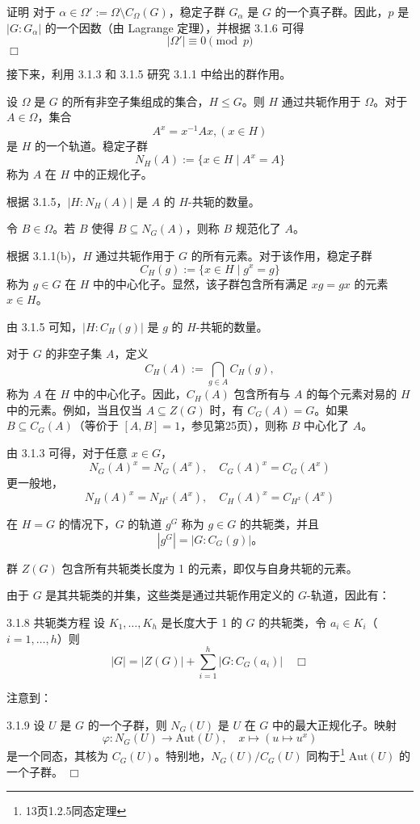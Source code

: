 \documentclass[UTF8]{ctexart}
\begin{document}
证明
对于 $\alpha \in \Omega' := \Omega \setminus C_\Omega(G)$，稳定子群 $G_\alpha$ 是 $G$ 的一个真子群。因此，$p$ 是 $|G : G_\alpha|$ 的一个因数（由 Lagrange 定理），并根据 3.1.6 可得
$$
    |\Omega'| \equiv 0 \pmod{p}
$$
$\Box$


接下来，利用 3.1.3 和 3.1.5 研究 3.1.1 中给出的群作用。

设 $\Omega$ 是 $G$ 的所有非空子集组成的集合，$H \leq G$。则 $H$ 通过共轭作用于 $\Omega$。对于 $A \in \Omega$，集合
$$
    A^x = x^{-1}Ax  ,(x \in H)
$$
是 $H$ 的一个轨道。稳定子群
$$
    N_H(A) := \{x \in H \mid A^x = A\}
$$
称为 $A$ 在 $H$ 中的正规化子。

根据 3.1.5，$|H : N_H(A)|$ 是 $A$ 的 $H$-共轭的数量。

令 $B \in \Omega$。若 $B$ 使得 $B \subseteq N_G(A)$，则称 $B$ 规范化了 $A$。

根据 3.1.1(b)，$H$ 通过共轭作用于 $G$ 的所有元素。对于该作用，稳定子群
$$
    C_H(g) := \{x \in H \mid g^x = g\}
$$
称为 $g \in G$ 在 $H$ 中的中心化子。显然，该子群包含所有满足 $xg = gx$ 的元素 $x \in H$。

由 3.1.5 可知，$|H : C_H(g)|$ 是 $g$ 的 $H$-共轭的数量。

对于 $G$ 的非空子集 $A$，定义
$$
    C_H(A) := \bigcap_{g \in A} C_H(g),
$$
称为 $A$ 在 $H$ 中的中心化子。因此，$C_H(A)$ 包含所有与 $A$ 的每个元素对易的 $H$ 中的元素。例如，当且仅当 $A \subseteq Z(G)$ 时，有 $C_G(A) = G$。如果 $B \subseteq C_G(A)$（等价于 $[A, B] = 1$，参见第25页），则称 $B$ 中心化了 $A$。

由 3.1.3 可得，对于任意 $x \in G$，
$$
    N_G(A)^x = N_G(A^x), \quad C_G(A)^x = C_G(A^x)
$$
更一般地，
$$
    N_H(A)^x = N_{H^x}(A^x), \quad C_H(A)^x = C_{H^x}(A^x)
$$

在 $H = G$ 的情况下，$G$ 的轨道 $g^G$ 称为 $g \in G$ 的共轭类，并且
$$
    |g^G| = |G : C_G(g)|。
$$

群 $Z(G)$ 包含所有共轭类长度为 1 的元素，即仅与自身共轭的元素。

由于 $G$ 是其共轭类的并集，这些类是通过共轭作用定义的 $G$-轨道，因此有：


3.1.8 共轭类方程
设 $K_1, \dots, K_h$ 是长度大于 1 的 $G$ 的共轭类，令 $a_i \in K_i$（$i = 1, \dots, h$）则
$$
    |G| = |Z(G)| + \sum_{i=1}^h |G : C_G(a_i)| \quad \Box
$$


注意到：

3.1.9
设 $U$ 是 $G$ 的一个子群，则 $N_G(U)$ 是 $U$ 在 $G$ 中的最大正规化子。映射
$$
    \varphi : N_G(U) \to \text{Aut}(U), \quad x \mapsto (u \mapsto u^x)
$$
是一个同态，其核为 $C_G(U)$。特别地，$N_G(U)/C_G(U)$ 同构于\footnote[5]{13页1.2.5同态定理} $\text{Aut}(U)$ 的一个子群。 $\Box$
\end{document}
